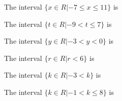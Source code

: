 \documentclass{ximera}
\begin{document}
\begin{exercise}
The interval $ \{  x \in R | -7 \leq x \leq 11  \} $ is 

\begin{multipleChoice}
\end{multipleChoice}

\end{exercise}





\begin{exercise}
The interval $ \{  t \in R | -9 < t \leq 7  \} $ is 

\begin{multipleChoice}
\end{multipleChoice}

\end{exercise}







\begin{exercise}
The interval $ \{  y \in R | -3 < y < 0  \} $ is 

\begin{multipleChoice}
\end{multipleChoice}

\end{exercise}








\begin{exercise}
The interval $ \{  r \in R | r < 6  \} $ is 

\begin{multipleChoice}
\end{multipleChoice}

\end{exercise}






\begin{exercise}
The interval $ \{  k \in R | -3 < k  \} $ is 

\begin{multipleChoice}
\end{multipleChoice}

\end{exercise}





\begin{exercise}
The interval $ \{  k \in R | -1 < k \leq 8  \} $ is 

\begin{multipleChoice}
\end{multipleChoice}

\end{exercise}
\end{document}
